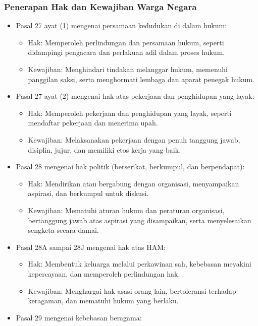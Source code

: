 \subsubsection{Penerapan Hak dan Kewajiban Warga Negara}
\begin{itemize}
\item Pasal 27 ayat (1) mengenai persamaan kedudukan di dalam hukum:
  \begin{itemize}
  \item Hak: Memperoleh perlindungan dan persamaan hukum, seperti didampingi pengacara dan perlakuan adil dalam proses hukum.
  \item Kewajiban: Menghindari tindakan melanggar hukum, memenuhi panggilan saksi, serta menghormati lembaga dan aparat penegak hukum.
  \end{itemize}
\item Pasal 27 ayat (2) mengenai hak atas pekerjaan dan penghidupan yang layak:
  \begin{itemize}
  \item Hak: Memperoleh pekerjaan dan penghidupan yang layak, seperti mendaftar pekerjaan dan menerima upah.
  \item Kewajiban: Melaksanakan pekerjaan dengan penuh tanggung jawab, disiplin, jujur, dan memiliki etos kerja yang baik.
  \end{itemize}
\item Pasal 28 mengenai hak politik (berserikat, berkumpul, dan berpendapat):
  \begin{itemize}
  \item Hak: Mendirikan atau bergabung dengan organisasi, menyampaikan aspirasi, dan berkumpul untuk diskusi.
  \item Kewajiban: Mematuhi aturan hukum dan peraturan organisasi, bertanggung jawab atas aspirasi yang disampaikan, serta menyelesaikan sengketa secara damai.
  \end{itemize}
\item Pasal 28A sampai 28J mengenai hak atas HAM:
  \begin{itemize}
  \item Hak: Membentuk keluarga melalui perkawinan sah, kebebasan meyakini kepercayaan, dan memperoleh perlindungan hak.
  \item Kewajiban: Menghargai hak asasi orang lain, bertoleransi terhadap keragaman, dan mematuhi hukum yang berlaku.
  \end{itemize}
\item Pasal 29 mengenai kebebasan beragama:
  \begin{itemize}

\end{itemize}
\end{itemize}

